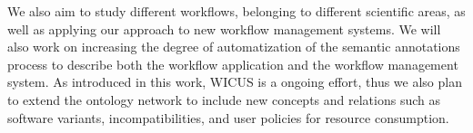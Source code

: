 We also aim to study different workflows, belonging to different scientific areas, as well as applying our approach to new workflow management systems. We will also work on increasing  the degree of automatization of the semantic annotations process to describe both the workflow application and the workflow management system. As introduced in this work, WICUS is a ongoing effort, thus we also plan to extend the ontology network to include new concepts and relations such as software variants, incompatibilities, and user policies for resource consumption.